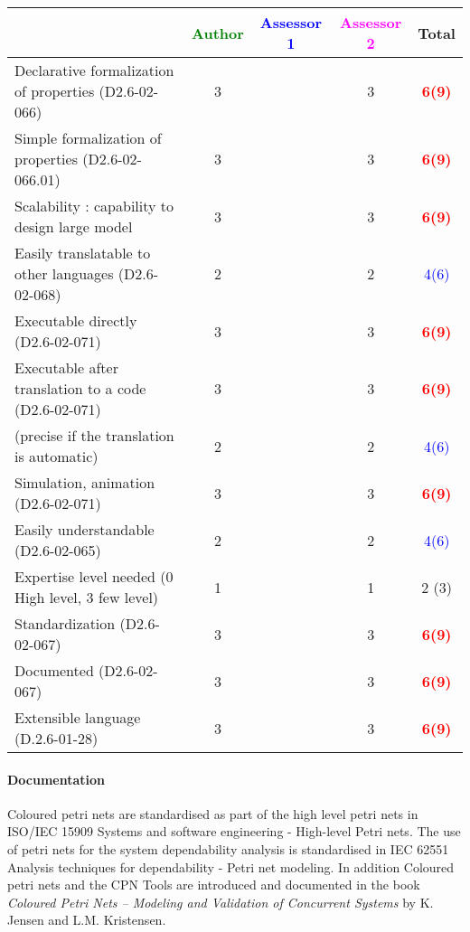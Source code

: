 \begin{tabular}{|l | c | c | c | c|}
\hline
& \textcolor{green}{Author} & \textcolor{blue}{Assessor 1} & \textcolor{magenta}{Assessor 2} & Total \\
\hline
Declarative formalization of properties (D2.6-02-066) & 3     & & 3     & \textcolor{red}{\textbf{6(9)}}  \\
\hline
Simple formalization of properties (D2.6-02-066.01) & 3     & & 3     & \textcolor{red}{\textbf{6(9)}}  \\
\hline
Scalability : capability to design large model & 3     & & 3     & \textcolor{red}{\textbf{6(9)}}  \\
\hline
Easily translatable to other languages (D2.6-02-068) & 2     & & 2     & \textcolor{blue}{4(6)}  \\
\hline
Executable directly (D2.6-02-071) & 3     & & 3     & \textcolor{red}{\textbf{6(9)}}  \\
\hline
Executable after translation to a code (D2.6-02-071) & 3     & & 3     & \textcolor{red}{\textbf{6(9)}}  \\
(precise if the translation is automatic) & 2     & & 2     & \textcolor{blue}{4(6)}  \\
\hline
Simulation, animation (D2.6-02-071) & 3     & & 3     & \textcolor{red}{\textbf{6(9)}}  \\
\hline
Easily understandable (D2.6-02-065) & 2     & & 2     & \textcolor{blue}{4(6)}  \\
\hline
Expertise level needed (0 High level, 3 few level) & 1     & & 1     & 2 (3) \\
\hline
Standardization (D2.6-02-067) & 3     & & 3     & \textcolor{red}{\textbf{6(9)}}  \\
\hline
Documented (D2.6-02-067) & 3     & & 3     & \textcolor{red}{\textbf{6(9)}}  \\
\hline
Extensible language (D.2.6-01-28) & 3     & & 3     & \textcolor{red}{\textbf{6(9)}}  \\
\hline
\end{tabular}


\paragraph{Documentation} Coloured petri nets are standardised as part of the high level petri nets in ISO/IEC 15909 Systems and software engineering - High-level Petri nets. The use of petri nets for the system dependability analysis is standardised in IEC 62551 Analysis techniques for dependability - Petri net modeling. In addition Coloured petri nets and the CPN Tools are introduced and documented in the book \textit{Coloured Petri Nets -- Modeling and Validation of Concurrent Systems} by K. Jensen and L.M. Kristensen. 

